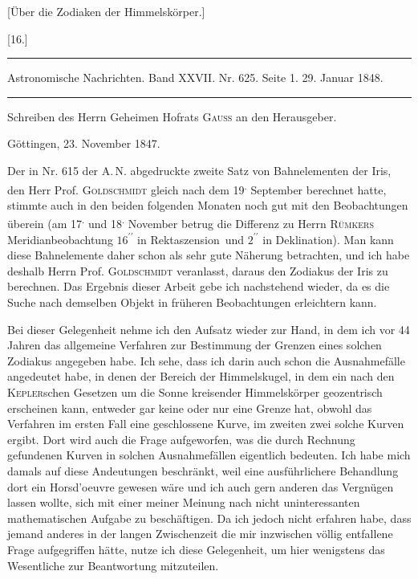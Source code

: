 \begin{center}
[Über die Zodiaken der Himmelskörper.]
\end{center}

\begin{center}
[16.]
\end{center}

\par\noindent\rule{\textwidth}{.3pt}\par

\noindent\small Astronomische Nachrichten. Band XXVII. Nr. 625. Seite 1. 29. Januar 1848.\normalsize

\par\noindent\rule{\textwidth}{.3pt}\par

\begin{center}
Schreiben des Herrn Geheimen Hofrats \textsc{Gauss} an den Herausgeber.

Göttingen, 23. November 1847.
\end{center}

Der in Nr. 615 der A.\,N. abgedruckte zweite Satz von Bahnelementen der Iris, den Herr Prof. \textsc{Goldschmidt} gleich nach dem 19\textsuperscript{.} September berechnet hatte, stimmte auch in den beiden folgenden Monaten noch gut mit den Beobachtungen überein (am 17\textsuperscript{.} und 18\textsuperscript{.} November betrug die Differenz zu Herrn \textsc{Rümkers} Meridianbeobachtung \(16^{\prime\prime}\) in Rektaszension\ und \(2^{\prime\prime}\) in Deklination). Man kann diese Bahnelemente daher schon als sehr gute Näherung betrachten, und ich habe deshalb Herrn Prof. \textsc{Goldschmidt} veranlasst, daraus den Zodiakus der Iris zu berechnen. Das Ergebnis dieser Arbeit gebe ich nachstehend wieder, da es die Suche nach demselben Objekt in früheren Beobachtungen erleichtern kann.

Bei dieser Gelegenheit nehme ich den Aufsatz\HistoricalNoteEight{Band VI, S. 106.]} wieder zur Hand, in dem ich vor 44 Jahren das allgemeine Verfahren zur Bestimmung der Grenzen eines solchen Zodiakus angegeben habe. Ich sehe, dass ich darin auch schon die Ausnahmefälle angedeutet habe, in denen der Bereich der Himmelskugel, in dem ein nach den \textsc{Kepler}schen Gesetzen um die Sonne kreisender Himmelskörper geozentrisch erscheinen kann, entweder gar keine oder nur eine Grenze hat, obwohl das Verfahren im ersten Fall eine geschlossene
Kurve, im zweiten zwei solche Kurven ergibt. Dort wird auch die Frage aufgeworfen, was die durch Rechnung gefundenen Kurven in solchen Ausnahmefällen eigentlich bedeuten. Ich habe mich damals auf diese Andeutungen beschränkt, weil eine ausführlichere Behandlung dort ein Horsd’oeuvre gewesen wäre und ich auch gern anderen das Vergnügen lassen wollte, sich mit einer meiner Meinung nach nicht uninteressanten mathematischen Aufgabe zu beschäftigen. Da ich jedoch nicht erfahren habe, dass jemand anderes in der langen Zwischenzeit die mir inzwischen völlig entfallene Frage aufgegriffen hätte, nutze ich diese Gelegenheit, um hier wenigstens das Wesentliche zur Beantwortung mitzuteilen.

